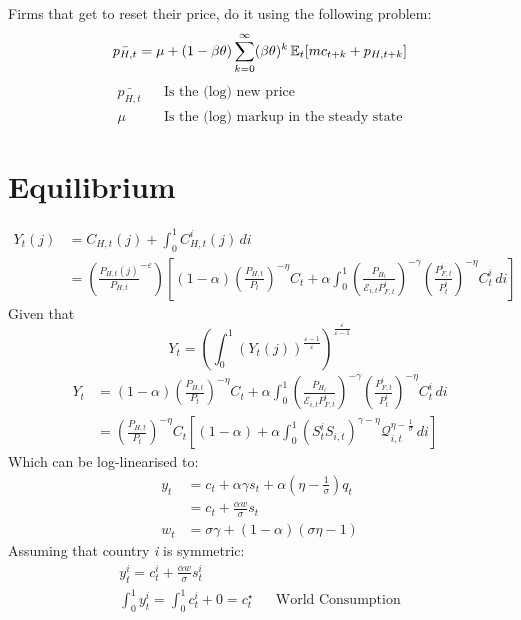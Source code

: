 \documentclass[12pt]{article}
\begin{document}
Firms that get to reset their price, do it using the following problem:
\begin{equation}
    \bar{p_{H,t}} = \mu + (1-\beta \theta) \sum_{k=0}^{\infty} (\beta \theta)^{k} \operatorname{\mathbb{E}}_t [mc_{t+k} + p_{H,t+k}]
\end{equation}
\begin{align}
    \bar{p_{H,t}} &  & \text{Is the (log) new price}                  \\
    \mu           &  & \text{Is the (log) markup in the steady state}
\end{align}
\section{Equilibrium}
\begin{align}
    Y_t(j) & = C_{H,t}(j) + \int_{0}^{1} C_{H,t}^i (j) \, di                                                                                                                                                                                                                                      \\
           & =\left(\frac{P_{H,t}(j)}{P_{H,t}}^{-\varepsilon}\right) \left[ (1-\alpha) \left(\frac{P_{H,t}}{P_t} \right)^{-\eta} C_t + \alpha \int_{0}^{1} \left( \frac{P_{H_t}}{\mathcal{E}_{i,t}P_{F,t}^i}\right)^{-\gamma} \left(\frac{P_{F,t}^i}{P_t^i} \right)^{-\eta} C_{t}^i \, di \right]
\end{align}
Given that
\begin{equation}
    Y_t = \left( \int_{0}^{1} (Y_t(j))^{\frac{\varepsilon-1}{\varepsilon}}\right)^{\frac{\varepsilon}{\varepsilon-1}}
\end{equation}
\begin{align}
    Y_t & = (1-\alpha) \left(\frac{P_{H,t}}{P_t} \right)^{-\eta} C_t + \alpha \int_{0}^{1} \left( \frac{P_{H_t}}{\mathcal{E}_{i,t}P_{F,t}^i}\right)^{-\gamma} \left(\frac{P_{F,t}^i}{P_t^i} \right)^{-\eta} C_{t}^i \, di \\
        & = \left(\frac{P_{H,t}}{P_t}\right)^{-\eta}C_t \left[ (1-\alpha) + \alpha \int_{0}^{1} (S_t^i S_{i,t})^{\gamma - \eta} \mathcal{Q}_{i,t}^{\eta - \frac{1}{\sigma}} \, di \right]
\end{align}
Which can be log-linearised to:
\begin{align}
    y_t & = c_t + \alpha \gamma s_t + \alpha(\eta - \frac{1}{\sigma})q_t \\
        & = c_t + \frac{\alpha w}{\sigma}s_t                             \\
    w_t & = \sigma \gamma + (1-\alpha)(\sigma \eta - 1)
\end{align}
Assuming that country \textit{i} is symmetric:
\begin{align}
    y_t^i = c_t^i + \frac{\alpha w}{\sigma} s_t^i            &  &                          \\
    \int_{0}^{1} y_t^i = \int_{0}^{1} c_t^i + 0 =c_t^{\star} &  & \text{World Consumption}
\end{align}
\end{document}
